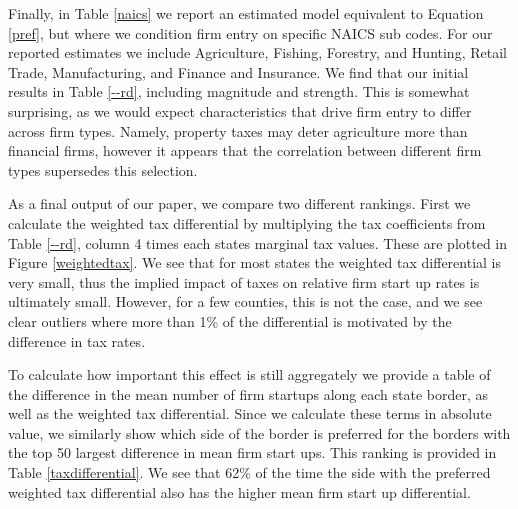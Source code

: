 Finally, in Table \ref{naics} we report an estimated model equivalent to Equation \ref{pref}, but where we condition firm entry on specific NAICS sub codes. For our reported estimates we include Agriculture, Fishing, Forestry, and Hunting, Retail Trade, Manufacturing, and Finance and Insurance. We find that our initial results in Table \ref{--rd}, including magnitude and strength. This is somewhat surprising, as we would expect characteristics that drive firm entry to differ across firm types. Namely, property taxes may deter agriculture more than financial firms, however it appears that the correlation between different firm types supersedes this selection.

As a final output of our paper, we compare two different rankings. First we calculate the weighted tax differential by multiplying the tax coefficients from Table \ref{--rd}, column 4 times each states marginal tax values. These are plotted in Figure \ref{weightedtax}. We see that for most states the weighted tax differential is very small, thus the implied impact of taxes on relative firm start up rates is ultimately small. However, for a few counties, this is not the case, and we see clear outliers where more than 1\% of the differential is motivated by the difference in tax rates. 

To calculate how important this effect is still aggregately we provide a table of the difference in the mean number of firm startups along each state border, as well as the weighted tax differential. Since we calculate these terms in absolute value, we similarly show which side of the border is preferred for the borders with the top 50 largest difference in mean firm start ups. This ranking is provided in Table \ref{taxdifferential}. We see that 62\% of the time the side with the preferred weighted tax differential also has the higher mean firm start up differential.
